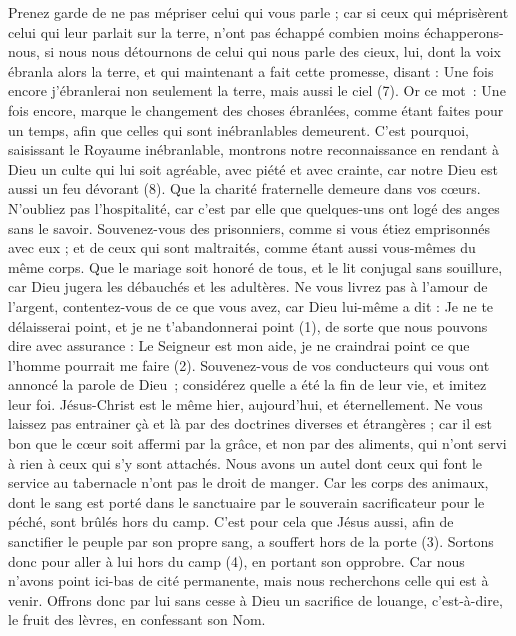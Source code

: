 \begin{multicols}{2}
Prenez garde de ne pas mépriser celui qui vous parle ; car si ceux qui méprisèrent celui qui leur parlait sur la terre, n’ont pas échappé combien moins échapperons-nous, si nous nous détournons de celui qui nous parle des cieux,
lui, dont la voix ébranla alors la terre, et qui maintenant a fait cette promesse, disant : Une fois encore j'ébranlerai non seulement la terre, mais aussi le ciel (7).
Or ce mot : Une fois encore, marque le changement des choses ébranlées, comme étant faites pour un temps, afin que celles qui sont inébranlables demeurent.
C'est pourquoi, saisissant le Royaume inébranlable, montrons notre reconnaissance en rendant à Dieu un culte qui lui soit agréable, avec piété et avec crainte,
car notre Dieu est aussi un feu dévorant (8).
\VerseOne{}Que la charité fraternelle demeure dans vos cœurs.
N'oubliez pas l'hospitalité, car c’est par elle que quelques-uns ont logé des anges sans le savoir.
Souvenez-vous des prisonniers, comme si vous étiez emprisonnés avec eux ; et de ceux qui sont maltraités, comme étant aussi vous-mêmes du même corps.
Que le mariage soit honoré de tous, et le lit conjugal sans souillure, car Dieu jugera les débauchés et les adultères.
Ne vous livrez pas à l’amour de l’argent, contentez-vous de ce que vous avez, car Dieu lui-même a dit : Je ne te délaisserai point, et je ne t'abandonnerai point (1),
de sorte que nous pouvons dire avec assurance : Le Seigneur est mon aide, je ne craindrai point ce que l'homme pourrait me faire (2).
Souvenez-vous de vos conducteurs qui vous ont annoncé la parole de Dieu ; considérez quelle a été la fin de leur vie, et imitez leur foi.
Jésus-Christ est le même hier, aujourd'hui, et éternellement.
Ne vous laissez pas entrainer çà et là par des doctrines diverses et étrangères ; car il est bon que le cœur soit affermi par la grâce, et non par des aliments, qui n'ont servi à rien à ceux qui s'y sont attachés.
Nous avons un autel dont ceux qui font le service au tabernacle n'ont pas le droit de manger.
Car les corps des animaux, dont le sang est porté dans le sanctuaire par le souverain sacrificateur pour le péché, sont brûlés hors du camp.
C'est pour cela que Jésus aussi, afin de sanctifier le peuple par son propre sang, a souffert hors de la porte (3).
Sortons donc pour aller à lui hors du camp (4), en portant son opprobre.
Car nous n'avons point ici-bas de cité permanente, mais nous recherchons celle qui est à venir.
Offrons donc par lui sans cesse à Dieu un sacrifice de louange, c'est-à-dire, le fruit des lèvres, en confessant son Nom.

\end{multicols}

